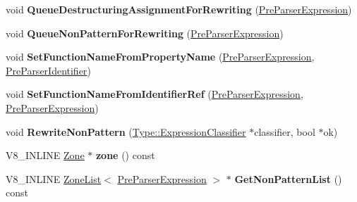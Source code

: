 \begin{DoxyCompactItemize}
\item 
void {\bfseries Queue\+Destructuring\+Assignment\+For\+Rewriting} (\hyperlink{classv8_1_1internal_1_1_pre_parser_expression}{Pre\+Parser\+Expression})\hypertarget{classv8_1_1internal_1_1_pre_parser_traits_aa69b20778857268dc4a44651c0c64b7d}{}\label{classv8_1_1internal_1_1_pre_parser_traits_aa69b20778857268dc4a44651c0c64b7d}

\item 
void {\bfseries Queue\+Non\+Pattern\+For\+Rewriting} (\hyperlink{classv8_1_1internal_1_1_pre_parser_expression}{Pre\+Parser\+Expression})\hypertarget{classv8_1_1internal_1_1_pre_parser_traits_a09cf42d0fe4abbf99d62b74559415df1}{}\label{classv8_1_1internal_1_1_pre_parser_traits_a09cf42d0fe4abbf99d62b74559415df1}

\item 
void {\bfseries Set\+Function\+Name\+From\+Property\+Name} (\hyperlink{classv8_1_1internal_1_1_pre_parser_expression}{Pre\+Parser\+Expression}, \hyperlink{classv8_1_1internal_1_1_pre_parser_identifier}{Pre\+Parser\+Identifier})\hypertarget{classv8_1_1internal_1_1_pre_parser_traits_ad68bc0815bafef449abd63ce43977c08}{}\label{classv8_1_1internal_1_1_pre_parser_traits_ad68bc0815bafef449abd63ce43977c08}

\item 
void {\bfseries Set\+Function\+Name\+From\+Identifier\+Ref} (\hyperlink{classv8_1_1internal_1_1_pre_parser_expression}{Pre\+Parser\+Expression}, \hyperlink{classv8_1_1internal_1_1_pre_parser_expression}{Pre\+Parser\+Expression})\hypertarget{classv8_1_1internal_1_1_pre_parser_traits_a4e5e443223363204add5421148a077f1}{}\label{classv8_1_1internal_1_1_pre_parser_traits_a4e5e443223363204add5421148a077f1}

\item 
void {\bfseries Rewrite\+Non\+Pattern} (\hyperlink{classv8_1_1internal_1_1_expression_classifier}{Type\+::\+Expression\+Classifier} $\ast$classifier, bool $\ast$ok)\hypertarget{classv8_1_1internal_1_1_pre_parser_traits_ab5285d4026c5523c944a0c7235a1e459}{}\label{classv8_1_1internal_1_1_pre_parser_traits_ab5285d4026c5523c944a0c7235a1e459}

\item 
V8\+\_\+\+I\+N\+L\+I\+NE \hyperlink{classv8_1_1internal_1_1_zone}{Zone} $\ast$ {\bfseries zone} () const \hypertarget{classv8_1_1internal_1_1_pre_parser_traits_acdb2c5cccb2b4ae4f1812de1d447c2bf}{}\label{classv8_1_1internal_1_1_pre_parser_traits_acdb2c5cccb2b4ae4f1812de1d447c2bf}

\item 
V8\+\_\+\+I\+N\+L\+I\+NE \hyperlink{classv8_1_1internal_1_1_zone_list}{Zone\+List}$<$ \hyperlink{classv8_1_1internal_1_1_pre_parser_expression}{Pre\+Parser\+Expression} $>$ $\ast$ {\bfseries Get\+Non\+Pattern\+List} () const \hypertarget{classv8_1_1internal_1_1_pre_parser_traits_ae337016cffbdbebabb719e8030edd13c}{}\label{classv8_1_1internal_1_1_pre_parser_traits_ae337016cffbdbebabb719e8030edd13c}


\end{DoxyCompactItemize}

